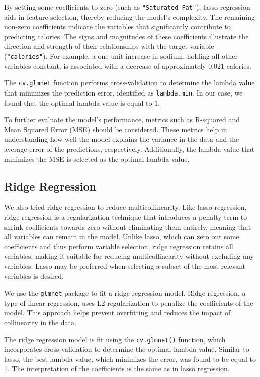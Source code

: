 \documentclass[
]{article}
\begin{document}
By setting some coefficients to zero (such as
\texttt{"Saturated\_Fat"}), lasso regression aids in feature selection,
thereby reducing the model's complexity. The remaining non-zero
coefficients indicate the variables that significantly contribute to
predicting calories. The signs and magnitudes of these coefficients
illustrate the direction and strength of their relationships with the
target variable (\texttt{"calories"}). For example, a one-unit increase
in sodium, holding all other variables constant, is associated with a
decrease of approximately \(0.021\) calories.

The \texttt{cv.glmnet} function performs cross-validation to determine
the lambda value that minimizes the prediction error, identified as
\texttt{lambda.min}. In our case, we found that the optimal lambda value
is equal to \(1\).

To further evaluate the model's performance, metrics such as R-squared
and Mean Squared Error (MSE) should be considered. These metrics help in
understanding how well the model explains the variance in the data and
the average error of the predictions, respectively. Additionally, the
lambda value that minimizes the MSE is selected as the optimal lambda
value.

\subsection{Ridge Regression}\label{ridge-regression}

We also tried ridge regression to reduce multicollinearity. Like lasso
regression, ridge regression is a regularization technique that
introduces a penalty term to shrink coefficients towards zero without
eliminating them entirely, meaning that all variables can remain in the
model. Unlike lasso, which can zero out some coefficients and thus
perform variable selection, ridge regression retains all variables,
making it suitable for reducing multicollinearity without excluding any
variables. Lasso may be preferred when selecting a subset of the most
relevant variables is desired.

We use the \texttt{glmnet} package to fit a ridge regression model.
Ridge regression, a type of linear regression, uses L2 regularization to
penalize the coefficients of the model. This approach helps prevent
overfitting and reduces the impact of collinearity in the data.

The ridge regression model is fit using the \texttt{cv.glmnet()}
function, which incorporates cross-validation to determine the optimal
lambda value. Similar to lasso, the best lambda value, which minimizes
the error, was found to be equal to 1. The interpretation of the
coefficients is the same as in lasso regression.
\end{document}
